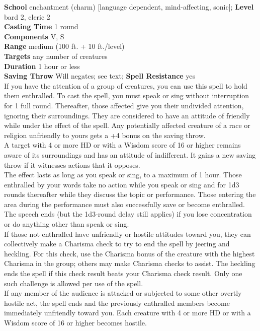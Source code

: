 \textbf{School} enchantment (charm) [language dependent, mind-affecting, sonic]; \textbf{Level} bard 2, cleric 2\\
\textbf{Casting Time} 1 round\\
\textbf{Components} V, S\\
\textbf{Range }medium (100 ft. + 10 ft./level)\\
\textbf{Targets} any number of creatures\\
\textbf{Duration} 1 hour or less\\
\textbf{Saving Throw }Will negates; see text; \textbf{Spell Resistance} yes\\
If you have the attention of a group of creatures, you can use this spell to hold them enthralled. To cast the spell, you must speak or sing without interruption for 1 full round. Thereafter, those affected give you their undivided attention, ignoring their surroundings. They are considered to have an attitude of friendly while under the effect of the spell. Any potentially affected creature of a race or religion unfriendly to yours gets a +4 bonus on the saving throw.\\
A target with 4 or more HD or with a Wisdom score of 16 or higher remains aware of its surroundings and has an attitude of indifferent. It gains a new saving throw if it witnesses actions that it opposes.\\
The effect lasts as long as you speak or sing, to a maximum of 1 hour. Those enthralled by your words take no action while you speak or sing and for 1d3 rounds thereafter while they discuss the topic or performance. Those entering the area during the performance must also successfully save or become enthralled. The speech ends (but the 1d3-round delay still applies) if you lose concentration or do anything other than speak or sing.\\
If those not enthralled have unfriendly or hostile attitudes toward you, they can collectively make a Charisma check to try to end the spell by jeering and heckling. For this check, use the Charisma bonus of the creature with the highest Charisma in the group; others may make Charisma checks to assist. The heckling ends the spell if this check result beats your Charisma check result. Only one such challenge is allowed per use of the spell.\\
If any member of the audience is attacked or subjected to some other overtly hostile act, the spell ends and the previously enthralled members become immediately unfriendly toward you. Each creature with 4 or more HD or with a Wisdom score of 16 or higher becomes hostile.\\
